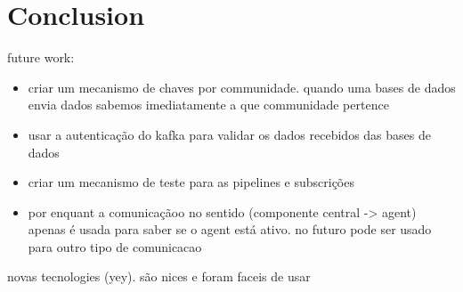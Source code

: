 \chapter{Conclusion}
\label{chapter:conclusion}

future work:
\begin{itemize}
    \item criar um mecanismo de chaves por communidade. quando uma bases de dados envia dados sabemos imediatamente a que communidade pertence
    \item usar a autenticação do kafka para validar os dados recebidos das bases de dados
    \item criar um mecanismo de teste para as pipelines e subscrições
    \item por enquant a comunicaçãoo no sentido (componente central -> agent) apenas é usada para saber se o agent está ativo. no futuro pode ser usado para outro tipo de comunicacao
\end{itemize}

novas tecnologies (yey). são nices e foram faceis de usar
